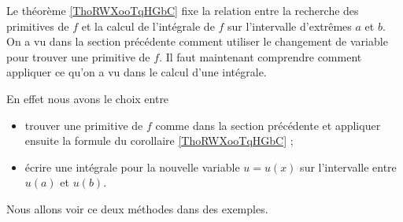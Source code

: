 Le théorème \ref{ThoRWXooTqHGbC} fixe la relation entre la recherche des primitives de $f $ et la calcul de l'intégrale de $f$ sur l'intervalle d'extrêmes $a$ et $b$. On a vu dans la section précédente comment utiliser le changement de variable pour trouver une primitive de $f$. Il faut maintenant comprendre comment appliquer ce qu'on a vu dans le calcul d'une intégrale.

En effet nous avons le choix entre
\begin{itemize}
\item trouver une primitive de $f$ comme dans la section précédente et appliquer ensuite la formule du corollaire \ref{ThoRWXooTqHGbC} ;
\item écrire une intégrale pour la nouvelle variable $u = u(x)$ sur l'intervalle entre $u(a)$ et $u(b)$.
\end{itemize}

Nous allons voir ce deux méthodes dans des exemples.

